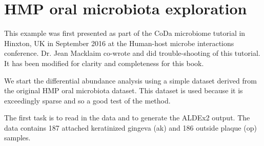 \documentclass[onecolumn]{book}
\theoremstyle{definition}
\theoremstyle{definition}
\theoremstyle{definition}
\theoremstyle{remark}
\begin{document}
\hypertarget{oral}{%
\chapter{HMP oral microbiota exploration}\label{oral}}

\hspace{2cm}\begin{minipage}[ct]{10cm}
\parskip=5pt
\parindent=5pt
This example was first presented as part of the CoDa microbiome tutorial in Hinxton, UK in September 2016 at the Human-host microbe interactions conference. Dr. Jean Macklaim co-wrote and did trouble-shooting of this tutorial. It has been modified for clarity and completeness for this book.
\end{minipage}
\vspace{1cm}

We start the differential abundance analysis using a simple dataset
derived from the original HMP oral microbiota dataset. This dataset is
used because it is exceedingly sparse and so a good test of the method.

The first task is to read in the data and to generate the ALDEx2 output.
The data contains 187 attached keratinized gingeva (ak) and 186 outside
plaque (op) samples.
\end{document}
